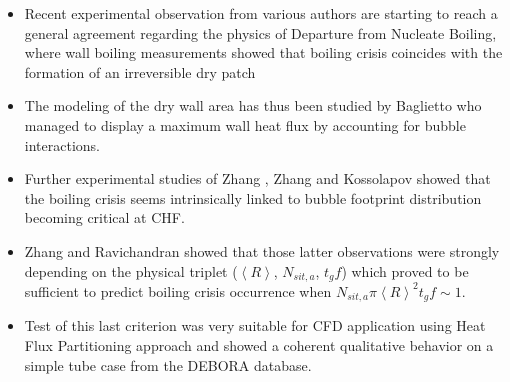 \begin{itemize}
\item Recent experimental observation from various authors are starting to reach a general agreement regarding the physics of Departure from Nucleate Boiling, where wall boiling measurements showed that boiling crisis coincides with the formation of an irreversible dry patch

\item The modeling of the dry wall area has thus been studied by Baglietto \etal \cite{baglietto_boiling_2019} who managed to display a maximum wall heat flux by accounting for bubble interactions.

\item Further experimental studies of Zhang \etal \cite{zhang_percolative_2019}, Zhang \cite{zhang_new_2022} and Kossolapov \cite{kossolapov_experimental_2021} showed that the boiling crisis seems intrinsically linked to bubble footprint distribution becoming critical at CHF.  

\item Zhang \cite{zhang_new_2022} and Ravichandran \etal \cite{ravichandran_infrared_2022} showed that those latter observations were strongly depending on the physical triplet ($\left<R\right>$, $N_{sit,a}$, $t_{g}f$) which proved to be sufficient to predict boiling crisis occurrence when $N_{sit,a} \pi \left<R\right>^{2} t_{g}f \sim 1$.

\item Test of this last criterion was very suitable for CFD application using Heat Flux Partitioning approach and showed a coherent qualitative behavior on a simple tube case from the DEBORA database.
\end{itemize}